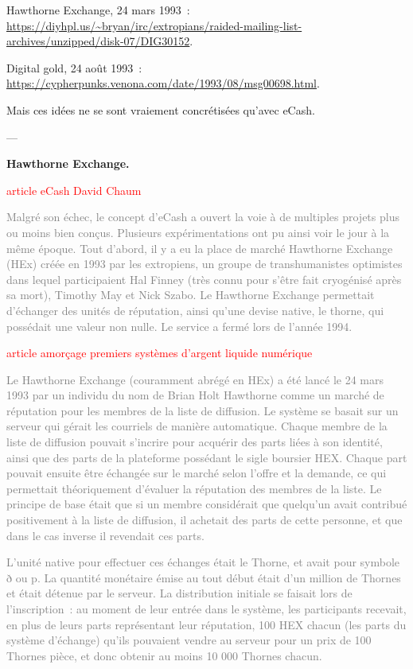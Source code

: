 Hawthorne Exchange, 24 mars 1993~: \url{https://diyhpl.us/~bryan/irc/extropians/raided-mailing-list-archives/unzipped/disk-07/DIG30152}.

Digital gold, 24 août 1993~: \url{https://cypherpunks.venona.com/date/1993/08/msg00698.html}.

Mais ces idées ne se sont vraiement concrétisées qu'avec eCash.

---

\textbf{Hawthorne Exchange.}

\textcolor{red}{article eCash David Chaum}

\textcolor{gray}{Malgré son échec, le concept d'eCash a ouvert la voie à de multiples projets plus ou moins bien conçus. Plusieurs expérimentations ont pu ainsi voir le jour à la même époque. Tout d'abord, il y a eu la place de marché Hawthorne Exchange (HEx) créée en 1993 par les extropiens, un groupe de transhumanistes optimistes dans lequel participaient Hal Finney (très connu pour s'être fait cryogénisé après sa mort), Timothy May et Nick Szabo. Le Hawthorne Exchange permettait d'échanger des unités de réputation, ainsi qu'une devise native, le thorne, qui possédait une valeur non nulle. Le service a fermé lors de l'année 1994.}


\textcolor{red}{article amorçage premiers systèmes d'argent liquide numérique}

\textcolor{gray}{Le Hawthorne Exchange (couramment abrégé en HEx) a été lancé le 24 mars 1993 par un individu du nom de Brian Holt Hawthorne comme un marché de réputation pour les membres de la liste de diffusion. Le système se basait sur un serveur qui gérait les courriels de manière automatique. Chaque membre de la liste de diffusion pouvait s'incrire pour acquérir des parts liées à son identité, ainsi que des parts de la plateforme possédant le sigle boursier HEX. Chaque part pouvait ensuite être échangée sur le marché selon l'offre et la demande, ce qui permettait théoriquement d'évaluer la réputation des membres de la liste. Le principe de base était que si un membre considérait que quelqu'un avait contribué positivement à la liste de diffusion, il achetait des parts de cette personne, et que dans le cas inverse il revendait ces parts.}

\textcolor{gray}{L'unité native pour effectuer ces échanges était le Thorne, et avait pour symbole ð ou p. La quantité monétaire émise au tout début était d'un million de Thornes et était détenue par le serveur. La distribution initiale se faisait lors de l'inscription~: au moment de leur entrée dans le système, les participants recevait, en plus de leurs parts représentant leur réputation, 100 HEX chacun (les parts du système d'échange) qu'ils pouvaient vendre au serveur pour un prix de 100 Thornes pièce, et donc obtenir au moins 10 000 Thornes chacun.}

